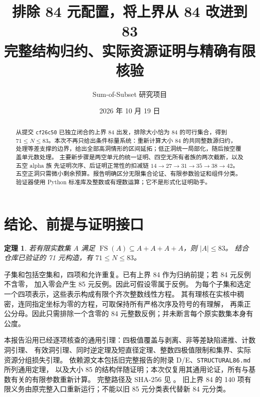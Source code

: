 \documentclass[11pt,a4paper]{article}
\title{排除 84 元配置，将上界从 84 改进到 83\\\large 完整结构归约、实际资源证明与精确有限核验}
\author{Sum-of-Subset 研究项目}
\date{2026 年 10 月 19 日}
\newcommand{\FS}{\operatorname{FS}}
\newtheorem{theorem}{定理}[section]
\begin{document}
\maketitle
\begin{abstract}
从提交 \texttt{cf26c50} 已独立闭合的上界 84 出发，排除大小恰为 84 的可行集合，得到
$71\le N\le83$。本次不再只给出条件标量系统：重新计算大小 84 的共同整数源归约，
处理等差支撑的边界，给出全部高洞情形的区间延拓；低正洞统一局部化，随后按空覆盖单元数处理。
主要新步骤是两空单元的统一证明、四空无所有者族的两次截断，以及五空 alpha 族
先证明次序、后证明正常性的扣减链 $14\to27\to31\to35\to38\to42$。
五空正洞只需微小剩余预算。报告明确区分无限集合论证、有限参数验证和组件分类。
验证器使用 Python 标准库及整数或有理数运算；它不是形式化证明助手。
\end{abstract}
\tableofcontents
\newpage

\section{结论、前提与证明接口}
\begin{theorem}\label{thm:main}
若有限实数集 $A$ 满足 $\FS(A)\subseteq A+A+A+A$，则 $|A|\le83$。
结合仓库已验证的 71 元构造，有 $\boxed{71\le N\le83}$。
\end{theorem}
子集和包括空集和，四项和允许重复。已有上界 84 作为归纳前提；若 84 元反例不含零，
加入零会产生 85 元反例。因此可假设零属于反例。
为每个子集和选定一个四项表示，这些表示构成有限个齐次整数线性方程。
其有理核在实核中稠密，连同指定坐标为零的方程，可取保持所有严格次序及符号的有理解，
再乘正公分母。因此只需排除一个含零的 84 元整数反例；并未断言每个原实数集本身有公度。

本报告沿用已经逐项核查的通用引理：四极值覆盖与剥离、非等差缺陷递推、计数洞引理、
有效洞引理、同时逆定理及短直径定理、整数四极值限制和集界、实际资源分组损失引理。
依赖源文本包括旧完整报告的附录 D/E、\texttt{STRUCTURAL86.md} 所列通用定理，
以及大小 85 的结构伴随证明；本次仅复用其通用论证，所有与基数有关的有限参数重新计算。
完整路径及 SHA-256 见 。
旧上界 84 的 140 项有限义务由原完整入口重新运行；不能以旧 85 元分类表代替新 84 元分类。
\end{document}

